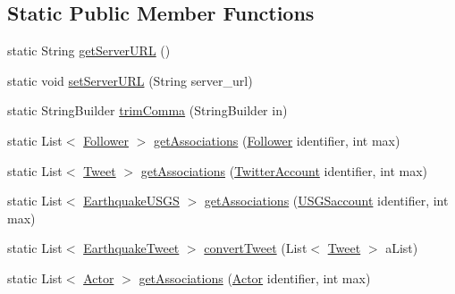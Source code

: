 \subsection*{Static Public Member Functions}
\begin{DoxyCompactItemize}
\item 
static String \hyperlink{classbridges_1_1connect_1_1_data_formatter_a4abc8f8b0970d6c07c680ac485e299c7}{get\+Server\+U\+RL} ()
\item 
static void \hyperlink{classbridges_1_1connect_1_1_data_formatter_a8490f20e53678329c1f74fcfc0088230}{set\+Server\+U\+RL} (String server\+\_\+url)
\item 
static String\+Builder \hyperlink{classbridges_1_1connect_1_1_data_formatter_af36897a55374e4922aabc19adb885052}{trim\+Comma} (String\+Builder in)
\item 
static List$<$ \hyperlink{classbridges_1_1data__src__dependent_1_1_follower}{Follower} $>$ \hyperlink{classbridges_1_1connect_1_1_data_formatter_a3877fbdef4320f03dba7f2a6832adfbb}{get\+Associations} (\hyperlink{classbridges_1_1data__src__dependent_1_1_follower}{Follower} identifier, int max)
\item 
static List$<$ \hyperlink{classbridges_1_1data__src__dependent_1_1_tweet}{Tweet} $>$ \hyperlink{classbridges_1_1connect_1_1_data_formatter_ab72a69ec0d2a1bf85d9d1fc6c6c3af54}{get\+Associations} (\hyperlink{classbridges_1_1data__src__dependent_1_1_twitter_account}{Twitter\+Account} identifier, int max)
\item 
static List$<$ \hyperlink{classbridges_1_1data__src__dependent_1_1_earthquake_u_s_g_s}{Earthquake\+U\+S\+GS} $>$ \hyperlink{classbridges_1_1connect_1_1_data_formatter_abdcbc3c914dc045cb532fae291d4f3a5}{get\+Associations} (\hyperlink{classbridges_1_1data__src__dependent_1_1_u_s_g_saccount}{U\+S\+G\+Saccount} identifier, int max)
\item 
static List$<$ \hyperlink{classbridges_1_1data__src__dependent_1_1_earthquake_tweet}{Earthquake\+Tweet} $>$ \hyperlink{classbridges_1_1connect_1_1_data_formatter_ad87ca06456fa4dc110e167e84f2d4447}{convert\+Tweet} (List$<$ \hyperlink{classbridges_1_1data__src__dependent_1_1_tweet}{Tweet} $>$ a\+List)
\item 
static List$<$ \hyperlink{classbridges_1_1data__src__dependent_1_1_actor}{Actor} $>$ \hyperlink{classbridges_1_1connect_1_1_data_formatter_a5e9f400a020b99e0bbba1fd5332a8f88}{get\+Associations} (\hyperlink{classbridges_1_1data__src__dependent_1_1_actor}{Actor} identifier, int max)
\item 

\end{DoxyCompactItemize}
